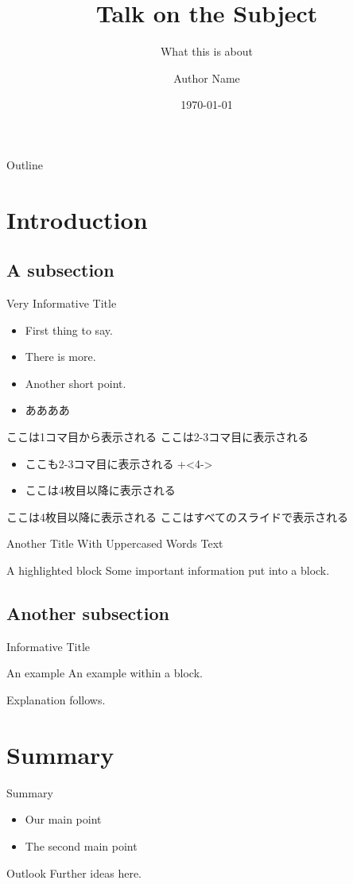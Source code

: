 \documentclass[dvipdfmx]{beamer}
\title{Talk on the Subject}
\subtitle{What this is about}
\author{Author Name}
\institute{@ the Institute}
\date{\today}
\begin{document}
\begin{frame}
  \titlepage
\end{frame}

\begin{frame}{Outline}
  \tableofcontents[]
\end{frame}

\section{Introduction}
\subsection{A subsection}
\begin{frame}{Very Informative Title}
  \begin{itemize}
    \item First thing to say.
    \item There is more.
    \item Another short point.
    \item ああああ
  \end{itemize}
\end{frame}

\begin{frame}
  ここは1コマ目から表示される
  ここは2-3コマ目に表示される
  \begin{itemize}
    \item
      ここも2-3コマ目に表示される
    \onslide+<4->
    \item
      ここは4枚目以降に表示される
  \end{itemize}
  ここは4枚目以降に表示される
  \onslide
  ここはすべてのスライドで表示される
\end{frame}

\begin{frame}{Another Title With Uppercased Words}
  Text
  \begin{alertblock}{A highlighted block}
    Some important information put into a block.
  \end{alertblock}
\end{frame}

\subsection{Another subsection}
\begin{frame}{Informative Title}
  \begin{exampleblock}{An example}
    An example within a block.
  \end{exampleblock}
  Explanation follows.
\end{frame}

\section{Summary}
\begin{frame}{Summary}
  \begin{itemize}
    \item Our \alert{main point}
    \item The \alert{second main point}
  \end{itemize}
  \vfill
  \begin{block}{Outlook}
    Further ideas here.
  \end{block}
\end{frame}
\end{document}
